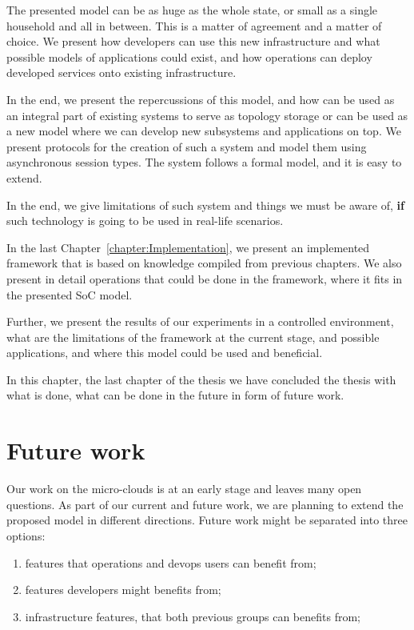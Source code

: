 The presented model can be as huge as the whole state, or small as a single household and all in between. This is a matter of agreement and a matter of choice. We present how developers can use this new infrastructure and what possible models of applications could exist, and how operations can deploy developed services onto existing infrastructure.

In the end, we present the repercussions of this model, and how can be used as an integral part of existing systems to serve as topology storage or can be used as a new model where we can develop new subsystems and applications on top. We present protocols for the creation of such a system and model them using asynchronous session types. The system follows a formal model, and it is easy to extend.

In the end, we give limitations of such system and things we must be aware of, \textbf{if} such technology is going to be used in real-life scenarios.

In the last Chapter~\ref{chapter:Implementation}, we present an implemented framework that is based on knowledge compiled from previous chapters. We also present in detail operations that could be done in the framework, where it fits in the presented SoC model.

Further, we present the results of our experiments in a controlled environment, what are the limitations of the framework at the current stage, and possible applications, and where this model could be used and beneficial.

In this chapter, the last chapter of the thesis we have concluded the thesis with what is done, what can be done in the future in form of future work.
%
%
\section{Future work}\label{sec:future_work}
%
Our work on the micro-clouds is at an early stage and leaves many open questions. As part of our current and future work, we are planning to extend the proposed model in different directions. Future work might be separated into three options:
 
\begin{enumerate}[start=1,label={(\bfseries \arabic*)}]
	\item features that operations and devops users can benefit from;
	\item features developers might benefits from;
	\item infrastructure features, that both previous groups can benefits from;
\end{enumerate}

